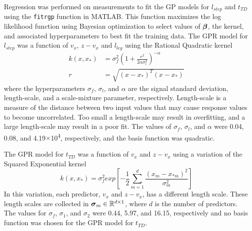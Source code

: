 Regression was performed on measurements to fit the GP models for $ l_{step} $ and $ t_{TD} $ using the \texttt{fitrgp} function in  MATLAB. This function maximizes the log likelihood function using Bayesian optimization to select values of $ \boldsymbol{\beta} $, the kernel, and associated hyperparameters to best fit the training data. The GPR model for $ l_{step} $ was a function of $ v_x $, $ z-v_x $ and $ l_{leg} $ using the Rational Quadratic kernel 
\begin{align*}
	k(x,x_*) &= \sigma_f^2 \left( 1 + \frac{r^2}{2 \alpha \sigma_l^2}\right)^{-\alpha}\\
	r &= \sqrt{(x-x_*)^T(x-x_*)}
\end{align*}
where the hyperparameters $ \sigma_f $, $ \sigma_l $, and $ \alpha $ are the signal standard deviation, length-scale, and a scale-mixture parameter, respectively. Length-scale is a measure of the distance between two input values that may cause response values to become uncorrelated. Too small a length-scale may result in overfitting, and a large length-scale may result in a poor fit. The values of $ \sigma_f $, $ \sigma_l $, and $ \alpha $ were 0.04, 0.08, and 4.19$ \times $10\textsuperscript{4}, respectively, and the basis function was quadratic.

The GPR model for $ t_{TD} $ was a function of $ v_x $ and $ z-v_x $ using a variation of the Squared Exponential kernel  
\[
	k(x,x_*) = \sigma_f^2 exp\left[-\frac{1}{2} \displaystyle \sum_{m = 1}^{d} \frac{(x_m - x_{*m})^2}{\sigma_m^2} \right]
\]
In this variation, each predictor, $ v_x $ and $ z-v_x $, has a different length scale. These length scales are collected in $ \boldsymbol{\sigma}_m \in \mathbb{R}^{d \times 1}$, where $ d $ is the number of predictors. The values for $ \sigma_f $, $ \sigma_1 $, and $ \sigma_2 $ were 0.44, 5.97, and 16.15, respectively and no basis function was chosen for the GPR model for $ t_{TD} $.  
%
%

